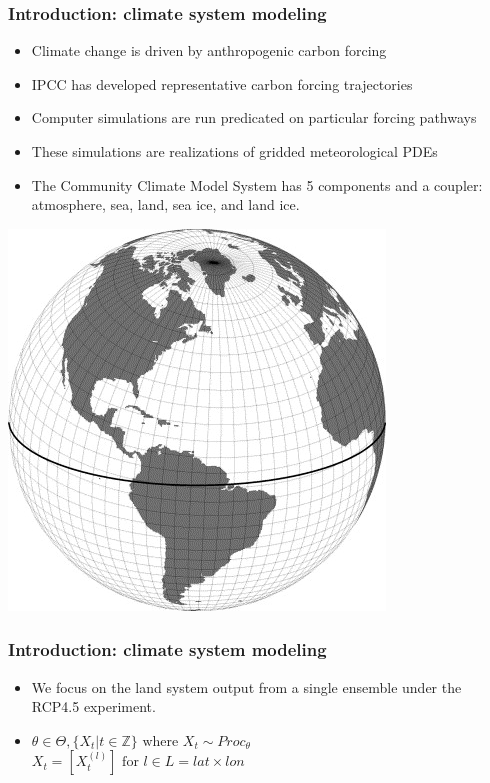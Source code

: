\documentclass{beamer}
\begin{document}
\begin{frame}
    \frametitle{Introduction: climate system modeling}
    \begin{itemize}
        \item Climate change is driven by anthropogenic carbon forcing
        \item IPCC has developed representative carbon forcing trajectories
        \item Computer simulations are run predicated on particular forcing
            pathways
        \item These simulations are realizations of gridded meteorological PDEs
        \item The Community Climate Model System has 5 components and a coupler:
            atmosphere, sea, land, sea ice, and land ice.
    \end{itemize}
    \includegraphics[width=\textwidth/2]{../img/greenland_pole_grid.jpg}
\end{frame}

\begin{frame}
    \frametitle{Introduction: climate system modeling}
    \begin{itemize}
        \item We focus on the land system output from a single ensemble under
            the RCP4.5 experiment.

        \item $\theta\in\Theta, \{X_t|t\in\mathbb{Z}\} \textrm{ where }
            X_t\sim Proc_\theta$\\
            $X_t = [X_t^{(l)}] \textrm{ for } l\in L = lat\times lon$
    \end{itemize}
\end{frame}
\end{document}
